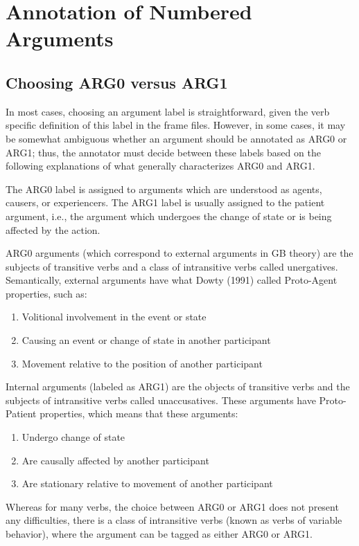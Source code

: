 \documentclass[11pt]{report}
\begin{document}
\section{Annotation of Numbered Arguments}
\subsection{Choosing ARG0 versus ARG1}
\label{ssec: Choosing ARG0 versus ARG1}
In most cases, choosing an argument label is straightforward, given the verb specific definition of this label in the frame files. However, in some cases, it may be somewhat ambiguous whether an argument should be annotated as ARG0 or ARG1; thus, the annotator must decide between these labels based on the following explanations of what generally characterizes ARG0 and ARG1.  

The ARG0 label is assigned to arguments which are understood as agents, causers, or experiencers. The ARG1 label is usually assigned to the patient argument, i.e., the argument which undergoes the change of state or is being affected by the action. 

ARG0 arguments (which correspond to external arguments in GB theory) are the subjects of transitive verbs and a class of intransitive verbs called unergatives. Semantically, external arguments have what Dowty (1991) called Proto-Agent properties, such as:
\begin{enumerate}
\item Volitional involvement in the event or state 
\item Causing an event or change of state in another participant
\item Movement relative to the position of another participant
\cite{dowty-91}
\end{enumerate}

Internal arguments (labeled as ARG1) are the objects of transitive verbs and the subjects of intransitive verbs called unaccusatives. These arguments have Proto-Patient properties, which means that these arguments:
\begin{enumerate}
\item Undergo change of state 
\item Are causally affected by another participant 
\item Are stationary relative to movement of another participant 
\cite{dowty-91}

\end{enumerate}

Whereas for many verbs, the choice between ARG0 or ARG1 does not present any difficulties, there is a class of intransitive verbs (known as verbs of variable behavior), where the argument can be tagged as either ARG0 or ARG1.
\end{document}
